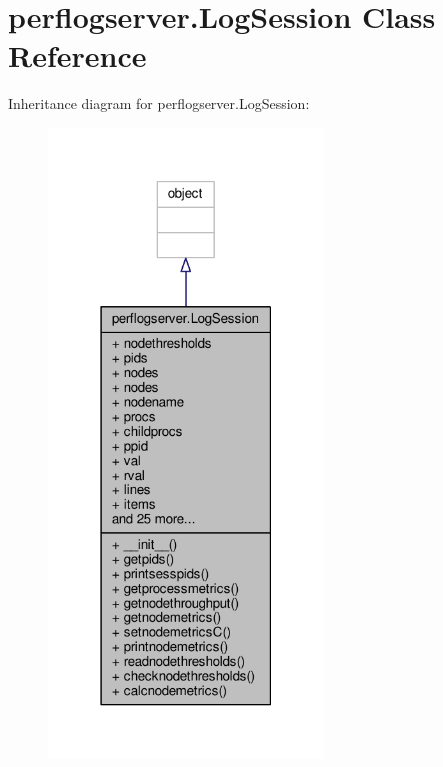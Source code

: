 \hypertarget{classperflogserver_1_1_log_session}{\section{perflogserver.\+Log\+Session Class Reference}
\label{classperflogserver_1_1_log_session}
}


Inheritance diagram for perflogserver.\+Log\+Session\+:
\nopagebreak
\begin{figure}[H]
\begin{center}
\leavevmode
\includegraphics[width=207pt]{classperflogserver_1_1_log_session__inherit__graph}
\end{center}
\end{figure}


